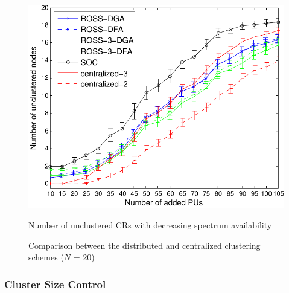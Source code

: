\documentclass[10pt,journal,compsoc]{IEEEtran}
\theoremstyle{mytheoremstyle}
\theoremstyle{mytheoremstyle}
\theoremstyle{mytheoremstyle}
\begin{document}
\begin{figure}[th]
\begin{multicols}{3}
    \includegraphics[width=\linewidth]{survival_rate_20.pdf}\par\caption{Number of unclustered CRs with decreasing spectrum availability}\label{singleton_clusters}
\end{multicols}
\caption{Comparison between the distributed and centralized clustering schemes ($N$ = 20)}
\label{compare_dis_centralized}
\end{figure}



\subsubsection{Cluster Size Control}
\label{cluster_size}
\end{document}
